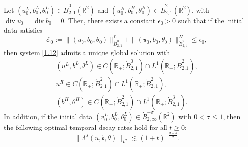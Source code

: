 \documentclass[reqno]{amsart}
\begin{document}
 \begin{theorem}\label{thm3}
 Let $(u_0^L, b_0^L, \theta_0^L)\in \dot{B}^0_{2,1}(\mathbb{R}^2)$ and
 $(u_0^H, b_0^H, \theta_0^H)\in \dot{B}^2_{2,1}(\mathbb{R}^2)$, with
 $\operatorname{div} u_0=\operatorname{div} b_0=0$. Then, there exists a
constant $\epsilon_0>0$ such that if the initial data satisfies
\begin{equation} \label{1.10}
 \mathcal{E}_0:=\|(u_0,b_0,\theta_0)\|_{\dot{B}^0_{2,1}}^L+\|(u_0,b_0,\theta_0)\|_{\dot{B}^2_{2,1}}^H\leqslant\epsilon_0,
\end{equation}
then system \eqref{1.12} admits a unique global solution with
\begin{equation} \label{1.11}
\begin{gathered}
(u^L,b^L,\theta^L)\in C(\mathbb{R}_+;\dot{B}^0_{2,1})\cap L^1(\mathbb{R}_+;\dot{B}^2_{2,1}),\\
u^H\in C(\mathbb{R}_+;\dot{B}^2_{2,1})\cap L^1(\mathbb{R}_+;\dot{B}^2_{2,1}), \\
(b^H,\theta^H)\in C(\mathbb{R}_+;\dot{B}^2_{2,1})\cap L^1(\mathbb{R}_+;\dot{B}^3_{2,1}).
 \end{gathered}
\end{equation}
 In addition, if the initial data $(u_0^L,b_0^L,\theta_0^L)\in \dot{B}^{-\sigma}_{2,\infty}(\mathbb{R}^2)$
 with $0<\sigma\leqslant 1$, then
 the following optimal temporal decay rates hold for all $t\geqslant 0$:
 \begin{equation} \label{1.16}
 \|\Lambda^s(u,b,\theta)\|_{L^2}\lesssim(1+t)^{-\frac{\sigma+s}{2}}.
 \end{equation}
 \end{theorem}
\end{document}
